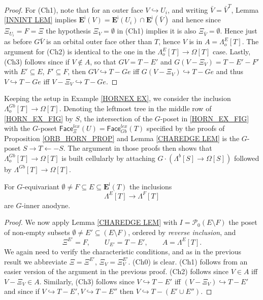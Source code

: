 \documentclass[a4paper,10pt
]{article}%
\begin{document}
\begin{proof}
For (Ch1), note that for an outer face 
$V \hookrightarrow U_i$, and writing $\bar{V} = \bar{V}^T$,
Lemma \ref{INNINT LEM} implies
$\boldsymbol{E}^{\mathsf{i}}(V) = 
\boldsymbol{E}^{\mathsf{i}}(U_i) \cap \boldsymbol{E}^{\mathsf{i}}(\bar{V})$
and hence since $\Xi_{U_i} = F = \Xi$ the 
hypothesis $\Xi_{V} = \emptyset$ in (Ch1) implies it is also
$\Xi_{\bar{V}} = \emptyset$.
Hence just as before $G\bar{V}$ is an orbital outer face other than $T$, hence $V$ is in $A=\Lambda_o^{E}[T]$.
The argument for (Ch2) is identical to the one in the
$\Lambda_o^{E}[T] \to \Omega[T]$ case.
Lastly, (Ch3) follows since	if $V \not \in A$, so that
$GV = T - E'$ and $G(V - \Xi_V) = T-E'-F'$ with
$E' \subseteq E$, $F' \subseteq F$,
then $GV \hookrightarrow T-Ge$ iff $G(V - \Xi_V) \hookrightarrow T-Ge$
and thus $V \hookrightarrow T-Ge$ iff $V - \Xi_V \hookrightarrow T-Ge$.
\end{proof}


\begin{example}
Keeping the setup in Example \ref{HORNEX EX}, we consider the inclusion $\Lambda_o^{Gb}[T] \to \Omega[T]$.
Denoting the leftmost tree in the middle row of \eqref{HORN_EX_FIG} by $S$, the intersection of the 
$G$-poset in \eqref{HORN_EX_FIG} with the $G$-poset 
$\mathsf{Face}^{lex}_{\Xi}(U)=
\mathsf{Face}^{lex}_{Gb}(T)$
specified by the proofs of Proposition \ref{ORB_HORN_PROP} and Lemma \ref{CHAREDGE LEM} is the $G$-poset
$S \to T \leftarrow -S$.
The argument in those proofs then shows that $\Lambda_o^{Gb}[T] \to \Omega[T]$ is built cellularly by attaching
$G \cdot \left(\Lambda^b[S] \to \Omega[S]\right)$
followed by $\Lambda^{Gb}[T] \to \Omega[T]$.
\end{example}


\begin{proposition}\label{REG_HORN_PROP}
For $G$-equivariant 
$\emptyset \neq F \subseteq E \subseteq 
\boldsymbol{E}^{\mathsf{i}}(T)$
the inclusions
\begin{equation}
	\Lambda^{E}[T] \to \Lambda^{F}[T]
\end{equation}
are $G$-inner anodyne.
\end{proposition}

\begin{proof}
We now apply Lemma \ref{CHAREDGE LEM} with 
$I = \mathcal{P}_0(E\setminus F)$
the poset of non-empty subsets $\emptyset \neq E' \subseteq (E \setminus F)$, ordered by \textit{reverse inclusion}, and
\[
	\Xi^{E'} = F, \qquad
	U_{E'} = T - E', \qquad
	A=\Lambda^{E}[T].
\]
We again need to verify the characteristic conditions,
and as in the previous result we abbreviate
$\Xi = \Xi^{E'}$, $\Xi_V = \Xi^{E'}_V$.
(Ch0) is clear. (Ch1) follows from an easier version of the argument in the previous proof.
(Ch2) follows since $V \in A$ iff $V-\Xi_V \in A$.
Similarly,
(Ch3) follows since 
$V \hookrightarrow T-E'$ iff $(V-\Xi_V) \hookrightarrow T-E'$
and since if
$V \hookrightarrow T-E',V \hookrightarrow T-E''$
then 
$V \hookrightarrow T-(E' \cup E'')$.
\end{proof}
\end{document}
